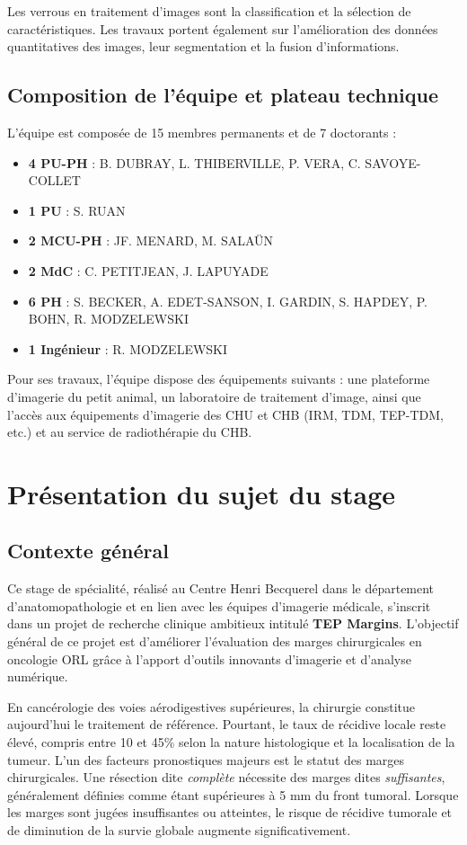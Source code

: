 \documentclass[12pt,a4paper]{report}
\let\oldchapter\chapter
\renewcommand{\chapter}{\clearpage\oldchapter}
\begin{document}
Les verrous en traitement d'images sont la classification et la sélection de caractéristiques. Les travaux portent également sur l'amélioration des données quantitatives des images, leur segmentation et la fusion d'informations.

\section{Composition de l'équipe et plateau technique}

L'équipe est composée de 15 membres permanents et de 7 doctorants :

\begin{itemize}
\item \textbf{4 PU-PH} : B. DUBRAY, L. THIBERVILLE, P. VERA, C. SAVOYE-COLLET
\item \textbf{1 PU} : S. RUAN
\item \textbf{2 MCU-PH} : JF. MENARD, M. SALAÜN
\item \textbf{2 MdC} : C. PETITJEAN, J. LAPUYADE
\item \textbf{6 PH} : S. BECKER, A. EDET-SANSON, I. GARDIN, S. HAPDEY, P. BOHN, R. MODZELEWSKI
\item \textbf{1 Ingénieur} : R. MODZELEWSKI
\end{itemize}

Pour ses travaux, l'équipe dispose des équipements suivants : une plateforme d'imagerie du petit animal, un laboratoire de traitement d'image, ainsi que l'accès aux équipements d'imagerie des CHU et CHB (IRM, TDM, TEP-TDM, etc.) et au service de radiothérapie du CHB.

\chapter{Présentation du sujet du stage}

\section{Contexte général}

Ce stage de spécialité, réalisé au Centre Henri Becquerel dans le département d'anatomopathologie et en lien avec les équipes d'imagerie médicale, s'inscrit dans un projet de recherche clinique ambitieux intitulé \textbf{TEP Margins}. L'objectif général de ce projet est d'améliorer l'évaluation des marges chirurgicales en oncologie ORL grâce à l'apport d'outils innovants d'imagerie et d'analyse numérique.

En cancérologie des voies aérodigestives supérieures, la chirurgie constitue aujourd'hui le traitement de référence. Pourtant, le taux de récidive locale reste élevé, compris entre 10 et 45\% selon la nature histologique et la localisation de la tumeur. L'un des facteurs pronostiques majeurs est le statut des marges chirurgicales. Une résection dite \textit{complète} nécessite des marges dites \textit{suffisantes}, généralement définies comme étant supérieures à 5 mm du front tumoral. Lorsque les marges sont jugées insuffisantes ou atteintes, le risque de récidive tumorale et de diminution de la survie globale augmente significativement.
\end{document}
